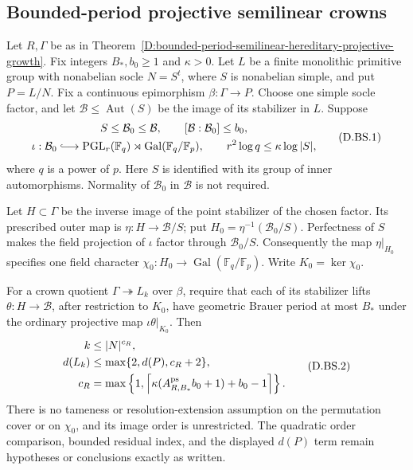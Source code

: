 \subsection{Bounded-period projective semilinear crowns}

\begin{corollary}
\label{D:bounded-period-arbitrary-quotient-projective-semilinear-crowns}
Let $R,\Gamma$ be as in
Theorem~\ref{D:bounded-period-semilinear-hereditary-projective-growth}.
Fix integers $B_*,b_0\ge1$ and $\kappa>0$.
Let $L$ be a finite monolithic primitive group with
nonabelian socle $N=S^t$, where $S$ is nonabelian simple,
and put $P=L/N$. Fix a continuous epimorphism
$\beta:\Gamma\to P$. Choose one simple socle factor,
and let $\mathcal B\le\operatorname{Aut}(S)$ be the
image of its stabilizer in $L$.
Suppose
\[
 \begin{gathered}
 S\le\mathcal B_0\le\mathcal B,\qquad
 [\mathcal B:\mathcal B_0]\le b_0,\\
 \iota:\mathcal B_0\lhook\joinrel\longrightarrow
     \operatorname{PGL}_r(\mathbb F_q)
        \rtimes\operatorname{Gal}(\mathbb F_q/\mathbb F_p),
 \qquad r^2\log q\le\kappa\log|S|,
 \end{gathered}                                         \tag{D.BS.1}
\]
where $q$ is a power of $p$. Here $S$ is identified
with its group of inner automorphisms.
Normality of $\mathcal B_0$ in $\mathcal B$ is not
required.

Let $H\subset\Gamma$ be the inverse image of the point
stabilizer of the chosen factor. Its prescribed outer
map is $\eta:H\to\mathcal B/S$; put
$H_0=\eta^{-1}(\mathcal B_0/S)$.
Perfectness of $S$ makes the field projection of
$\iota$ factor through $\mathcal B_0/S$. Consequently
the map $\eta|_{H_0}$ specifies one field character
$\chi_0:H_0\to\operatorname{Gal}(\mathbb F_q/\mathbb F_p)$.
Write $K_0=\ker\chi_0$.

For a crown quotient $\Gamma\twoheadrightarrow L_k$
over $\beta$, require that each of its stabilizer
lifts $\theta:H\to\mathcal B$, after restriction to
$K_0$, have geometric Brauer period at most $B_*$
under the ordinary projective map $\iota\theta|_{K_0}$.
Then
\[
 \begin{aligned}
 k&\le |N|^{c_R},\\
 d(L_k)&\le\max\{2,d(P),c_R+2\},\\
 c_R&=\max\left\{1,
  \left\lceil\kappa(A_{R,B_*}^{\rm ps}b_0+1)+b_0-1
                                              \right\rceil\right\}.
 \end{aligned}                                         \tag{D.BS.2}
\]
There is no tameness or resolution-extension assumption
on the permutation cover or on $\chi_0$, and its image
order is unrestricted. The quadratic order comparison,
bounded residual index, and the displayed $d(P)$ term
remain hypotheses or conclusions exactly as written.


\end{corollary}
